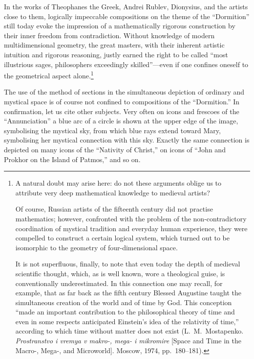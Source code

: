 

In the works of Theophanes the Greek, Andrei Rublev, Dionysius, and the artists close
to them, logically impeccable compositions on the theme of the ``Dormition'' still today
evoke the impression of a mathematically rigorous construction by their inner freedom from
contradiction.  Without knowledge of modern multidimensional geometry, the great masters,
with their inherent artistic intuition and rigorous reasoning, justly earned the right to
be called ``most illustrious sages, philosophers exceedingly skilled''---even if one
confines oneself to the geometrical aspect alone.\footnote{A natural doubt may arise here:
  do not these arguments oblige us to attribute very deep mathematical knowledge to
  medieval artists?

  Of course, Russian artists of the fifteenth century did not practise mathematics;
  however, confronted with the problem of the non-contradictory coordination of mystical
  tradition and everyday human experience, they were compelled to construct a certain
  logical system, which turned out to be isomorphic to the geometry of four-dimensional
  space.

  It is not superfluous, finally, to note that even today the depth of medieval
  scientific thought, which, as is well known, wore a theological guise, is conventionally
  underestimated.  In this connection one may recall, for example, that as far back as
  the fifth century Blessed Augustine taught the simultaneous creation of the world and
  of time by God.  This conception ``made an important contribution to the philosophical
  theory of time and even in some respects anticipated Einstein's idea of the relativity
  of time,'' according to which time without matter does not exist (L.~M.~Mostapenko.
  \emph{Prostranstvo i vremya v makro-, mega- i mikromire} [Space and Time in the Macro-,
  Mega-, and Microworld].  Moscow, 1974, pp.~180--181).}


The use of the method of sections in the simultaneous depiction of ordinary and mystical
space is of course not confined to compositions of the ``Dormition.''  In confirmation,
let us cite other subjects.  Very often on icons and frescoes of the ``Annunciation'' a
blue arc of a circle is shown at the upper edge of the image, symbolising the mystical
sky, from which blue rays extend toward Mary, symbolising her mystical connection with
this sky.  Exactly the same connection is depicted on many icons of the ``Nativity of
Christ,'' on icons of ``John and Prokhor on the Island of Patmos,'' and so on.

